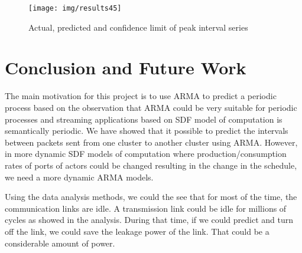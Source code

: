 \documentclass[12pt]{article}
\begin{document}
\begin{figure}[ht!]
\centering
\texttt{[image: img/results45]}
\caption{Actual, predicted and confidence limit of peak interval
series}\label{fig:results45}
\end{figure}

\section{Conclusion and Future Work}
The main motivation for this project is to use ARMA to predict a
periodic process based on the observation that ARMA could be very suitable for
periodic processes and streaming applications based on SDF model of computation
is semantically periodic. We have showed that it possible to predict the
intervals between packets sent from one cluster to another cluster using ARMA.
However, in more dynamic SDF models of computation where
production/consumption rates of ports of actors could be changed resulting in
the change in the schedule, we need a more dynamic ARMA models. 

Using the data analysis methods, we could the see that for most of the time, the
communication links are idle. A transmission link could be idle for millions of
cycles as showed in the analysis. During that time, if we could predict and turn
off the link, we could save the leakage power of the link. That could be a
considerable amount of power.



\end{document}
